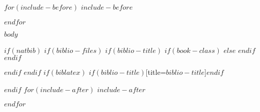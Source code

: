 \documentclass[$for(classoption)$$classoption$$sep$,$endfor$,twoside,openright]{book}
\begin{document}
$for(include-before)$
$include-before$

$endfor$

$body$

$if(natbib)$
$if(biblio-files)$
$if(biblio-title)$
$if(book-class)$
\renewcommand\bibname{$biblio-title$}
$else$
\renewcommand\refname{$biblio-title$}
$endif$
$endif$


$endif$
$endif$
$if(biblatex)$
\printbibliography$if(biblio-title)$[title=$biblio-title$]$endif$

$endif$
$for(include-after)$
$include-after$

$endfor$
\end{document}
